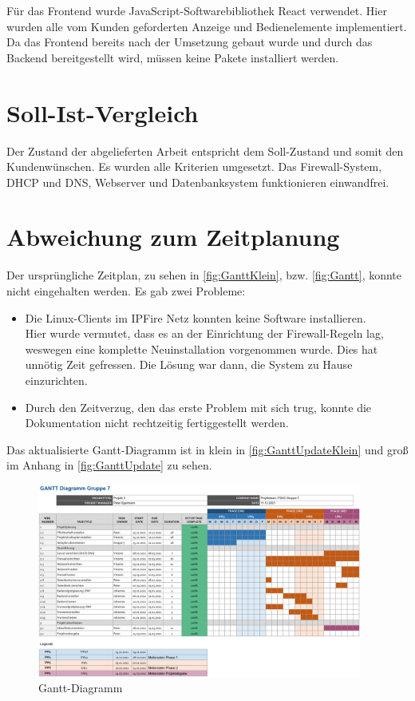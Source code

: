 \documentclass[a4paper,
    11pt,
    headings=small,
    ngerman,
    listof=totoc,
    numbers=noenddot]{scrreprt}[2021/11/13]
\begin{document}
Für das Frontend wurde JavaScript-Softwarebibliothek React verwendet. Hier wurden alle vom Kunden geforderten Anzeige und Bedienelemente implementiert. Da das Frontend bereits nach der Umsetzung gebaut wurde und durch das Backend bereitgestellt wird, müssen keine Pakete installiert werden.



\section{Soll-Ist-Vergleich}

Der Zustand der abgelieferten Arbeit entspricht dem Soll-Zustand und somit den Kundenwünschen. Es wurden alle Kriterien umgesetzt. Das Firewall-System, DHCP und DNS, Webserver und Datenbanksystem funktionieren einwandfrei.



\section{Abweichung zum Zeitplanung}

Der ursprüngliche Zeitplan, zu sehen in \vref{fig:GanttKlein}, bzw. \vref{fig:Gantt}, konnte nicht eingehalten werden. Es gab zwei Probleme:

\begin{itemize}
  \item Die Linux-Clients im IPFire Netz konnten keine Software installieren. \\
        Hier wurde vermutet, dass es an der Einrichtung der Firewall-Regeln lag, weswegen eine komplette Neuinstallation vorgenommen wurde. Dies hat unnötig Zeit gefressen. Die Lösung war dann, die System zu Hause einzurichten.
  \item Durch den Zeitverzug, den das erste Problem mit sich trug, konnte die Dokumentation nicht rechtzeitig fertiggestellt werden.
\end{itemize}

Das aktualisierte Gantt-Diagramm ist in klein in \vref{fig:GanttUpdateKlein} und groß im Anhang in \vref{fig:GanttUpdate} zu sehen.

\begin{figure}[htbp]
  \centering
  \includegraphics[width=0.95\textwidth]{data/Gantt_Abschluss.png}
  \caption{Gantt-Diagramm}
  \label{fig:GanttUpdateKlein}
\end{figure}
\end{document}
